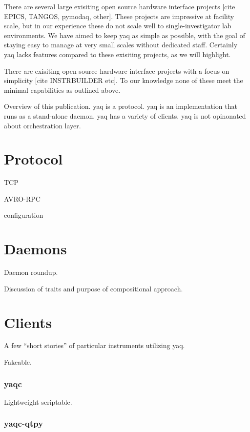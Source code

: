 \documentclass{article}
\begin{document}
There are several large exisiting open source hardware interface projects [cite EPICS, TANGOS, pymodaq, other].
These projects are impressive at facility scale, but in our experience these do not scale well to single-investigator lab environments.
We have aimed to keep yaq as simple as possible, with the goal of staying easy to manage at very small scales without dedicated staff.
Certainly yaq lacks features compared to these exisiting projects, as we will highlight.

There are exisiting open source hardware interface projects with a focus on simplicity [cite INSTRBUILDER etc].
To our knowledge none of these meet the minimal capabilities as outlined above.

Overview of this publication.
yaq is a protocol.
yaq is an implementation that runs as a stand-alone daemon.
yaq has a variety of clients.
yaq is not opinonated about orchestration layer.

\section{Protocol}

TCP

AVRO-RPC

configuration

\section{Daemons}

Daemon roundup.

Discussion of traits and purpose of compositional approach.

\section{Clients}

A few ``short stories'' of particular instruments utilizing yaq.

Fakeable.

\subsubsection{yaqc}

Lightweight scriptable.

\subsubsection{yaqc-qtpy}
\end{document}
